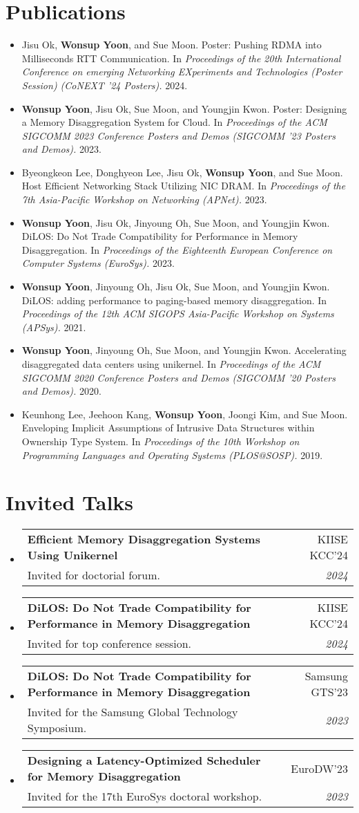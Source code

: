 \documentclass[letterpaper,11pt]{article}
\makeatletter
\newcommand{\resumePub}[1]{
  \item\small{#1 \vspace{-2pt}}
}
\newcommand{\resumeSubheading}[4]{
  \vspace{-1pt}\item
    \begin{tabular*}{0.97\textwidth}[t]{l@{\extracolsep{\fill}}r}
      \textbf{#1} & #2 \\
      {\small#3} & \textit{\small #4} \\
    \end{tabular*}\vspace{-5pt}
}
\newcommand{\resumeSubHeadingListStart}{\begin{itemize}[leftmargin=*]}
\newcommand{\resumeSubHeadingListEnd}{\end{itemize}}
\makeatother
\begin{document}
\section{Publications}
\resumeSubHeadingListStart
\resumePub{Jisu Ok, \textbf{Wonsup Yoon}, and Sue Moon. Poster: Pushing RDMA into Milliseconds RTT Communication. In \textit{Proceedings of the 20th International Conference on emerging Networking EXperiments and Technologies (Poster Session) (CoNEXT '24 Posters).} 2024.}
\resumePub{\textbf{Wonsup Yoon}, Jisu Ok, Sue Moon, and Youngjin Kwon. Poster: Designing a Memory Disaggregation System for Cloud. In \textit{Proceedings of the ACM SIGCOMM 2023 Conference Posters and Demos (SIGCOMM '23 Posters and Demos).} 2023.}
\resumePub{Byeongkeon Lee, Donghyeon Lee, Jisu Ok, \textbf{Wonsup Yoon}, and Sue Moon. Host Efficient Networking Stack Utilizing NIC DRAM. In \textit{Proceedings of the 7th Asia-Pacific Workshop on Networking (APNet).} 2023.}
\resumePub{\textbf{Wonsup Yoon}, Jisu Ok, Jinyoung Oh, Sue Moon, and Youngjin Kwon. DiLOS: Do Not Trade Compatibility for Performance in Memory Disaggregation. In \textit{Proceedings of the Eighteenth European Conference on Computer Systems (EuroSys).} 2023.}
\resumePub{\textbf{Wonsup Yoon}, Jinyoung Oh, Jisu Ok, Sue Moon, and Youngjin Kwon. DiLOS: adding performance to paging-based memory disaggregation. In \textit{Proceedings of the 12th ACM SIGOPS Asia-Pacific Workshop on Systems (APSys).} 2021.}
\resumePub{\textbf{Wonsup Yoon}, Jinyoung Oh, Sue Moon, and Youngjin Kwon. Accelerating disaggregated data centers using unikernel. In \textit{Proceedings of the ACM SIGCOMM 2020 Conference Posters and Demos (SIGCOMM '20 Posters and Demos).} 2020.}
\resumePub{Keunhong Lee, Jeehoon Kang, \textbf{Wonsup Yoon}, Joongi Kim, and Sue Moon. Enveloping Implicit Assumptions of Intrusive Data Structures within Ownership Type System. In \textit{Proceedings of the 10th Workshop on Programming Languages and Operating Systems (PLOS@SOSP).} 2019.}
\resumeSubHeadingListEnd



\section{Invited Talks}
\resumeSubHeadingListStart
\resumeSubheading{Efficient Memory Disaggregation Systems Using Unikernel}{KIISE KCC'24}{Invited for doctorial forum.}{2024}
\resumeSubheading{DiLOS: Do Not Trade Compatibility for Performance in Memory Disaggregation}{KIISE KCC'24}{Invited for top conference session.}{2024}
\resumeSubheading{DiLOS: Do Not Trade Compatibility for Performance in Memory Disaggregation}{Samsung GTS'23}{Invited for the Samsung Global Technology Symposium.}{2023}
\resumeSubheading{Designing a Latency-Optimized Scheduler for Memory Disaggregation}{EuroDW'23}{Invited for the 17th EuroSys doctoral workshop.}{2023}
\resumeSubHeadingListEnd
\end{document}
